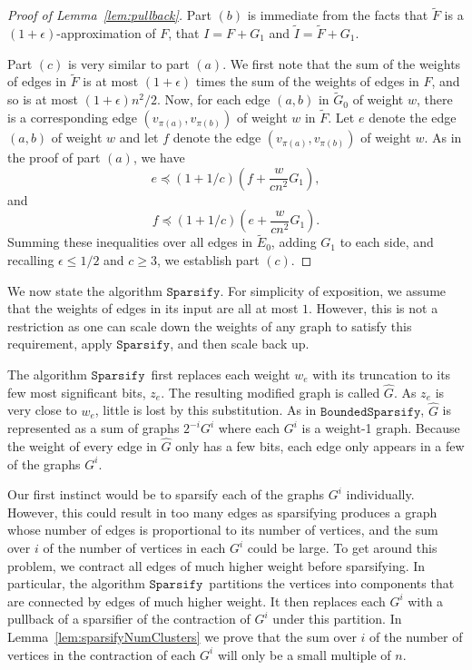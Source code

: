 \documentclass[11pt]{article}
\newcommand{\sparsify}{\ensuremath{\mathtt{Sparsify}}}
\newcommand{\boundedsparsify}{\ensuremath{\mathtt{BoundedSparsify}}}
\def\Itil{\widetilde{I}}
\def\Gtil{\widetilde{G}}
\def\Etil{\widetilde{E}}
\def\Ftil{\widetilde{F}}
\def\Ghat{\widehat{G}}
\def\pleq{\preccurlyeq}
\def\pleq{\preccurlyeq}
\begin{document}
\begin{proof}[Proof of Lemma~\ref{lem:pullback}]
Part $(b)$ is immediate from the facts that
   $\Ftil$ is a $(1+\epsilon)$-approximation
  of $F$, that $I = F + G_{1}$ and $\Itil = \Ftil + G_{1}$.

Part $(c)$ is very similar to part $(a)$.
We first note that the sum of the weights of edges in $\Ftil$
  is at most $(1+\epsilon)$ times the sum of the weights of edges
  in $F$, and so is at most $(1+\epsilon) n^{2}/2$.
Now, for each edge $(a,b)$ in $\Gtil_{0}$ of weight $w$, there is
  a corresponding edge $(v_{\pi (a)}, v_{\pi (b)})$ of weight $w$
  in $\Ftil$.
Let $e$ denote the edge $(a,b)$ of weight $w$ and let $f$ denote
  the edge $(v_{\pi (a)}, v_{\pi (b)})$ of weight $w$.
As in the proof of part $(a)$, we have
\[
  e \pleq (1+1/c) \left(f + \frac{w}{c n^{2}} G_{1}  \right),
\]
and
\[
  f \pleq (1+1/c) \left(e + \frac{w}{c n^{2}} G_{1}  \right).
\]
Summing these inequalities over all edges in $\Etil_{0}$,
  adding $G_{1}$ to each side, and recalling
  $\epsilon \leq 1/2$ and $c \geq 3$,
  we establish part $(c)$.
\end{proof}

We now state the algorithm \sparsify .
For simplicity of exposition, 
  we assume that the weights of edges in its input are all
  at most $1$.
However, this is not a restriction as one can scale down
   the weights of any graph to satisfy this requirement, apply \sparsify ,
  and then scale back up.

The algorithm \sparsify \ first replaces each weight $w_{e}$ with
  its truncation to its few most significant bits, $z_{e}$.
The resulting modified graph is called $\Ghat$.
As $z_{e}$ is very close to $w_{e}$, little is lost by this substitution.
As in \boundedsparsify , $\Ghat$ is represented as a sum of graphs 
  $2^{-i} G^{i}$ where each $G^{i}$ is a weight-1 graph.
Because the weight of every edge in $\Ghat$ only has a few bits,
  each edge only appears in a few of the graphs $G^{i}$.

Our first instinct would be to sparsify each of the graphs $G^{i}$ individually.
However, this could result in too many edges as sparsifying produces
  a graph whose number of edges is proportional to its number of vertices,
  and the sum over $i$ of the number of vertices in each $G^{i}$ could be large.
To get around this problem, we contract all edges of much higher weight
  before sparsifying.
In particular, the algorithm \sparsify \
  partitions the vertices into components that are connected by
  edges of much higher weight.
It then replaces each $G^{i}$ with a pullback of a
  sparsifier of the contraction of $G^{i}$ under this partition.
In Lemma~\ref{lem:sparsifyNumClusters} we prove that the sum over $i$ of the
  number of vertices in the contraction of each $G^{i}$ will only be
  a small multiple of $n$.
\end{document}
